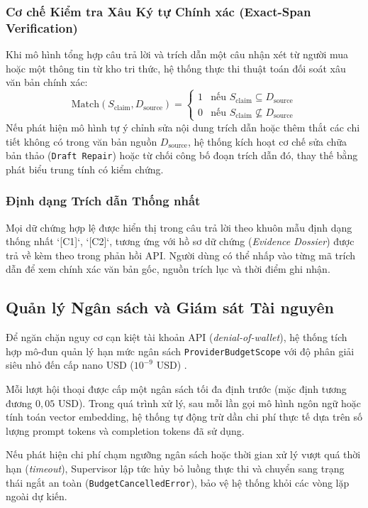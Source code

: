 \subsubsection{Cơ chế Kiểm tra Xâu Ký tự Chính xác (Exact-Span Verification)}
Khi mô hình tổng hợp câu trả lời và trích dẫn một câu nhận xét từ người mua hoặc một thông tin từ kho tri thức, hệ thống thực thi thuật toán đối soát xâu văn bản chính xác:
\begin{equation}
\text{Match}(S_{\text{claim}}, D_{\text{source}}) = 
\begin{cases} 
1 & \text{nếu } S_{\text{claim}} \subseteq D_{\text{source}} \\
0 & \text{nếu } S_{\text{claim}} \not\subseteq D_{\text{source}}
\end{cases}
\end{equation}
Nếu phát hiện mô hình tự ý chỉnh sửa nội dung trích dẫn hoặc thêm thắt các chi tiết không có trong văn bản nguồn $D_{\text{source}}$, hệ thống kích hoạt cơ chế sửa chữa bản thảo (\texttt{Draft Repair}) hoặc từ chối công bố đoạn trích dẫn đó, thay thế bằng phát biểu trung tính có kiểm chứng.

\subsubsection{Định dạng Trích dẫn Thống nhất}
Mọi dữ chứng hợp lệ được hiển thị trong câu trả lời theo khuôn mẫu định dạng thống nhất `[C1]`, `[C2]`, tương ứng với hồ sơ dữ chứng (\textit{Evidence Dossier}) được trả về kèm theo trong phản hồi API. Người dùng có thể nhấp vào từng mã trích dẫn để xem chính xác văn bản gốc, nguồn trích lục và thời điểm ghi nhận.

\subsection{Quản lý Ngân sách và Giám sát Tài nguyên}
Để ngăn chặn nguy cơ cạn kiệt tài khoản API (\textit{denial-of-wallet}), hệ thống tích hợp mô-đun quản lý hạn mức ngân sách \texttt{ProviderBudgetScope} với độ phân giải siêu nhỏ đến cấp nano USD ($10^{-9}$ USD) .

Mỗi lượt hội thoại được cấp một ngân sách tối đa định trước (mặc định tương đương $0{,}05$ USD). Trong quá trình xử lý, sau mỗi lần gọi mô hình ngôn ngữ hoặc tính toán vector embedding, hệ thống tự động trừ dần chi phí thực tế dựa trên số lượng prompt tokens và completion tokens đã sử dụng. 

Nếu phát hiện chi phí chạm ngưỡng ngân sách hoặc thời gian xử lý vượt quá thời hạn (\textit{timeout}), Supervisor lập tức hủy bỏ luồng thực thi và chuyển sang trạng thái ngắt an toàn (\texttt{BudgetCancelledError}), bảo vệ hệ thống khỏi các vòng lặp ngoài dự kiến.

